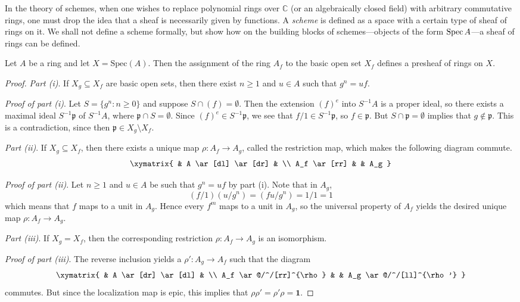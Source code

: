 In the theory of schemes, when one wishes to replace polynomial
rings over
$\mathbb{C}$ (or an algebraically closed field) with arbitrary
commutative
rings, one must drop the idea that a sheaf is necessarily given
by functions.
A \emph{scheme} is defined as a space with a certain type of
sheaf of rings on
it. We shall not define a scheme formally, but show how on the
building blocks
of schemes---objects of the form $\operatorname{Spec} A$---a sheaf of rings
can be defined.

\begin{proposition}
Let $ A$ be a ring and let $ X = \mathrm{Spec}(A)$. Then the
assignment of the ring $A_f$ to the basic open set $X_f$ defines
a presheaf of rings on $X$.
\end{proposition}

\begin{proof} \mbox{}

\emph{Part (i)}. If $ X_g \subseteq X_f$ are basic open sets,
then there exist $ n \geq 1$ and $ u \in A$ such that $ g^n =
uf$.

\emph{Proof of part (i)}. Let $ S = \{g^n : n \geq 0\}$ and
suppose $ S \cap (f) = \emptyset$. Then the extension $ (f)^e$
into $ S^{-1}A$ is a proper ideal, so there exists a maximal
ideal $ S^{-1}\mathfrak{p}$ of $ S^{-1}A$, where $ \mathfrak{p}
\cap S = \emptyset$. Since $ (f)^e \in S^{-1}\mathfrak{p}$, we
see that $ f/1 \in S^{-1}\mathfrak{p}$, so $ f \in
\mathfrak{p}$. But $ S \cap \mathfrak{p} = \emptyset$ implies
that $ g \notin \mathfrak{p}$. This is a contradiction, since
then $ \mathfrak{p} \in X_g \setminus X_f$.

\emph{Part (ii)}. If $ X_g \subseteq X_f$, then there exists a
unique map $ \rho : A_f \to A_g$, called the restriction map,
which makes the following diagram commute.
\[ \xymatrix{ & A \ar[dl] \ar[dr] & \\ A_f \ar[rr] & & A_g } \]

\emph{Proof of part (ii)}. 
Let $ n \geq 1$ and $ u \in A$ be such that $ g^n = uf$ by part
(i). Note that in $ A_g$,
\[ (f/1)(u/g^n) = (fu/g^n) = 1/1 = 1 \]
which means that $ f$ maps to a unit in $ A_g$. Hence every $
f^m$ maps to a unit in $ A_g$, so the universal property of $
A_f$ yields the desired unique map $ \rho : A_f \to A_g$.

\emph{Part (iii)}. 
If $ X_g = X_f$, then the corresponding restriction $ \rho : A_f
\to A_g$ is an isomorphism.

\emph{Proof of part (iii)}. 
The reverse inclusion yields a $ \rho' : A_g \to A_f$ such that
the diagram
\[ \xymatrix{
& A \ar[dr] \ar[dl] & \\
A_f \ar@/^/[rr]^{\rho} & & A_g \ar@/^/[ll]^{\rho'}
} \]
commutes. But since the localization map is epic, this implies
that $ \rho \rho' = \rho' \rho = \mathbf{1}$.


\end{proof}
